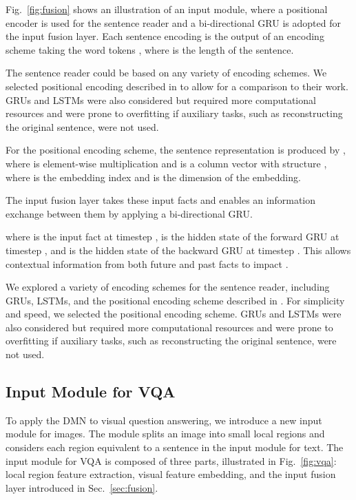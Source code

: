 \documentclass{article}
\begin{document}
Fig.~\ref{fig:fusion} shows an illustration of an input module, where a positional encoder is used for the sentence reader and a bi-directional GRU is adopted for the input fusion layer.
Each sentence encoding  is the output of an encoding scheme taking the word tokens , where  is the length of the sentence.

The sentence reader could be based on any variety of encoding schemes. We selected positional encoding described in \citet{Sukhbaatar2015} to allow for a comparison to their work.
GRUs and LSTMs were also considered but required more computational resources and were prone to overfitting if auxiliary tasks, such as reconstructing the original sentence, were not used.

For the positional encoding scheme, the sentence representation is produced by , where  is element-wise multiplication and  is a column vector with structure , where  is the embedding index and  is the dimension of the embedding.



The input fusion layer takes these input facts and enables an information exchange between them by applying a bi-directional GRU.

where  is the input fact at timestep ,  is the hidden state of the forward GRU at timestep , and  is the hidden state of the backward GRU at timestep .
This allows contextual information from both future and past facts to impact .

We explored a variety of encoding schemes for the sentence reader, including GRUs, LSTMs, and the positional encoding scheme described in \citet{Sukhbaatar2015}.
For simplicity and speed, we selected the positional encoding scheme.
GRUs and LSTMs were also considered but required more computational resources and were prone to overfitting if auxiliary tasks, such as reconstructing the original sentence, were not used.

\subsection{Input Module for VQA} \label{inputVQA}
To apply the DMN to visual question answering, we introduce a new input module for images. The module splits an image into small local regions and considers each region equivalent to a sentence in the input module for text.
The input module for VQA is composed of three parts, illustrated in Fig.~\ref{fig:vqa}: local region feature extraction, visual feature embedding, and the input fusion layer introduced in Sec.~\ref{sec:fusion}.
\end{document}
